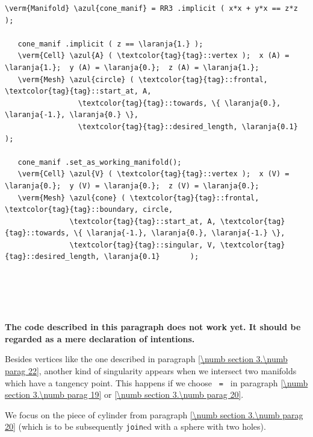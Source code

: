 \begin{Verbatim}[commandchars=\\\{\},formatcom=\small\tt,frame=single,
   label=code not working,rulecolor=\color{moldura},
   baselinestretch=0.94,framesep=2mm                                  ]
   \verm{Manifold} \azul{cone_manif} = RR3 .implicit ( x*x + y*x == z*z );

   cone_manif .implicit ( z == \laranja{1.} );
   \verm{Cell} \azul{A} ( \textcolor{tag}{tag}::vertex );  x (A) = \laranja{1.};  y (A) = \laranja{0.};  z (A) = \laranja{1.};
   \verm{Mesh} \azul{circle} ( \textcolor{tag}{tag}::frontal, \textcolor{tag}{tag}::start_at, A,
                 \textcolor{tag}{tag}::towards, \{ \laranja{0.}, \laranja{-1.}, \laranja{0.} \},
                 \textcolor{tag}{tag}::desired_length, \laranja{0.1}       );

   cone_manif .set_as_working_manifold();
   \verm{Cell} \azul{V} ( \textcolor{tag}{tag}::vertex );  x (V) = \laranja{0.};  y (V) = \laranja{0.};  z (V) = \laranja{0.};
   \verm{Mesh} \azul{cone} ( \textcolor{tag}{tag}::frontal, \textcolor{tag}{tag}::boundary, circle,
               \textcolor{tag}{tag}::start_at, A, \textcolor{tag}{tag}::towards, \{ \laranja{-1.}, \laranja{0.}, \laranja{-1.} \},
               \textcolor{tag}{tag}::singular, V, \textcolor{tag}{tag}::desired_length, \laranja{0.1}       );
\end{Verbatim}


\section{~~}\label{\numb section 3.\numb parag 23}

{\normalfont\bfseries The code described in this paragraph does not work yet.
It should be regarded as a mere declaration of intentions.}
\medskip

Besides vertices like the one described in paragraph \ref{\numb section 3.\numb parag 22},
another kind of singularity appears when we intersect two manifolds which have a tangency point.
This happens if we choose {\small\tt{} = } in paragraph
\ref{\numb section 3.\numb parag 19} or \ref{\numb section 3.\numb parag 20}.

We focus on the piece of cylinder from paragraph \ref{\numb section 3.\numb parag 20}
(which is to be subsequently {\small\tt join}ed with a sphere with two holes).

